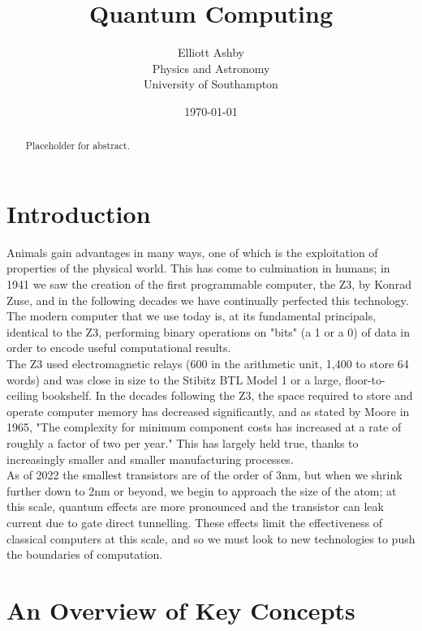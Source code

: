 \documentclass{amsart}
\title{Quantum Computing}
\author[Elliott Ashby]{Elliott Ashby \\ Physics and Astronomy \\ University of Southampton}
\date{\monthyeardate\today}
\numberwithin{equation}{section}
\begin{document}
\begin{abstract}
    Placeholder for abstract.
\end{abstract}
\maketitle
\tableofcontents
\newpage
\section{Introduction}
\begin{justify}
Animals gain advantages in many ways, one of which is the exploitation of properties of the physical world. This has come to culmination in humans; in 1941 we saw the creation of the first programmable computer, the Z3, by Konrad Zuse, and in the following decades we have continually perfected this technology. The modern computer that we use today is, at its fundamental principals, identical to the Z3, performing binary operations on "bits" (a 1 or a 0) of data in order to encode useful computational results. \\

The Z3 used electromagnetic relays (600 in the arithmetic unit, 1,400 to store 64 words) and was close in size to the Stibitz BTL Model 1 or a large, floor-to-ceiling bookshelf. \cite{KonradZuseObituary} In the decades following the Z3, the space required to store and operate computer memory has decreased significantly, and as stated by Moore in 1965, "The complexity for minimum component costs has increased at a rate of roughly a factor of two per year." \cite{Moore1965} This has largely held true, thanks to increasingly smaller and smaller manufacturing processes. \\

As of 2022 the smallest transistors are of the order of 3nm, \cite{Samsung_2022} but when we shrink further down to 2nm or beyond, we begin to approach the size of the atom; at this scale, quantum effects are more pronounced and the transistor can leak current due to gate direct tunnelling. \cite{2nmGateOxide} These effects limit the effectiveness of classical computers at this scale, and so we must look to new technologies to push the boundaries of computation.
\end{justify}

\section{An Overview of Key Concepts}
\end{document}
